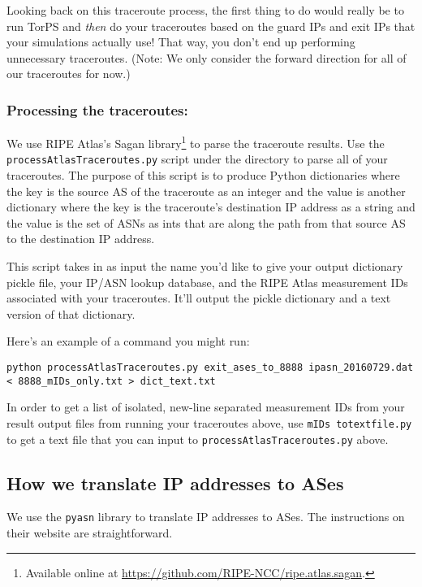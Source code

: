 \documentclass{article}
\begin{document}
\begin{itemize}
\end{itemize}

Looking back on this traceroute process, the first thing to do
would really be to run TorPS and \emph{then}
do your traceroutes based on the guard IPs and exit IPs that your simulations
actually use! That way, you don't end up performing unnecessary traceroutes.
(Note: We only consider the forward direction for all of our
traceroutes for now.)

\subsubsection{Processing the traceroutes:}
We use RIPE Atlas's Sagan library\footnote{Available online at
\url{https://github.com/RIPE-NCC/ripe.atlas.sagan}.} to parse the traceroute results. Use the
{\tt processAtlasTraceroutes.py} script under the  directory
to parse all of your traceroutes. The purpose of this script is to produce
Python dictionaries where the key is the source AS of the traceroute as an
integer and the value is another dictionary where the key is the traceroute's
destination IP address as a string and the value is the set of ASNs as ints that
are along the path from that source AS to the destination IP address.

This script takes in as input the name
you'd like to give your output dictionary pickle file, your IP/ASN lookup database,
and the RIPE Atlas measurement IDs associated with your traceroutes. It'll output
the pickle dictionary and a text version of that dictionary.

Here's an example of a command you might run:
\begin{lstlisting}
python processAtlasTraceroutes.py exit_ases_to_8888 ipasn_20160729.dat < 8888_mIDs_only.txt > dict_text.txt
\end{lstlisting}

In order to get a list of isolated, new-line separated measurement IDs from your result
output files from running your traceroutes above, use {\tt mIDs\textunderscore
to\textunderscore text\textunderscore file.py} to get a text file that you can
input to {\tt processAtlasTraceroutes.py} above.

\subsection{How we translate IP addresses to ASes}
We use the {\tt pyasn} library to translate IP addresses to ASes. The instructions
on their website are straightforward.
\end{document}

